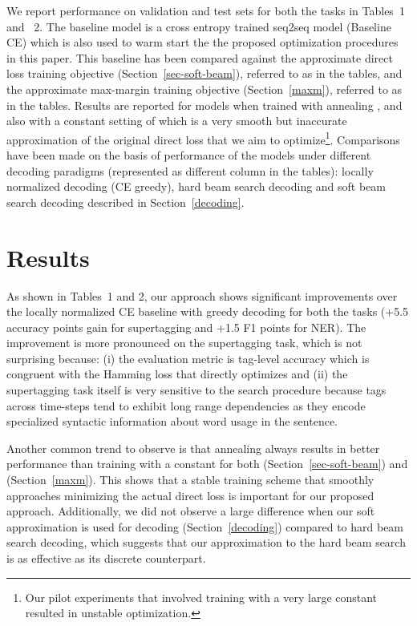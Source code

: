 \documentclass[letterpaper]{article} \usepackage{aaai18}  \usepackage{times}  \usepackage{helvet}  \usepackage{courier}  \usepackage{url}  \usepackage{graphicx}  \frenchspacing
\begin{document}
We report performance on validation and test sets for both the tasks in Tables~1 and ~2. The baseline model is a cross entropy trained seq2seq model (Baseline CE) which is also used to warm start the the proposed optimization procedures in this paper. This baseline has been compared against the approximate direct loss training objective (Section~\ref{sec-soft-beam}), referred to as  in the tables, and the approximate max-margin training objective (Section~\ref{maxm}), referred to as  in the tables. Results are reported for models when trained with annealing , and also with a constant setting of  which is a very smooth but inaccurate approximation of the original direct loss that we aim to optimize\footnote{Our pilot experiments that involved training with a very large constant  resulted in unstable optimization.}. Comparisons have been made on the basis of performance of the models under different decoding paradigms (represented as different column in the tables): locally normalized decoding (CE greedy), hard beam search decoding and soft beam search decoding described in Section~\ref{decoding}.
\section{Results}
\label{results}
As shown in Tables~1 and 2, our approach  shows significant improvements over the locally normalized CE baseline with greedy decoding for both the tasks (+5.5 accuracy points gain for supertagging and +1.5 F1 points for NER). The improvement is more pronounced on the supertagging task, which is not surprising because: (i) the evaluation metric is tag-level accuracy which is congruent with the Hamming loss that  directly optimizes and (ii) the supertagging task itself is very sensitive to the search procedure because tags across time-steps tend to exhibit long range dependencies as they encode specialized syntactic information about word usage in the sentence. 

Another common trend to observe is that annealing  always results in better performance than training with a constant  for both  (Section~\ref{sec-soft-beam}) and  (Section~\ref{maxm}). This shows that a stable training scheme that smoothly approaches minimizing the actual direct loss is important for our proposed approach. Additionally, we did not observe a large difference when our soft approximation is used for decoding (Section~\ref{decoding}) compared to hard beam search decoding, which suggests that our approximation to the hard beam search is as effective as its discrete counterpart.
\end{document}
